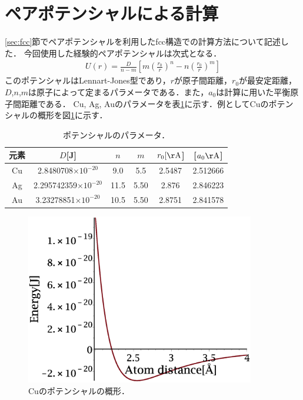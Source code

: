 \section{ペアポテンシャルによる計算}
\ref{sec:fcc}節でペアポテンシャルを利用したfcc構造での計算方法について記述した．
今回使用した経験的ペアポテンシャルは次式となる．
\begin{eqnarray}
\label{eq:method1}
U(r)=\frac{D}{n-m}\left[m{\left(\frac{r_0}{r}\right)}^n-n{\left(\frac{r_0}{r}\right)}^m\right]
\end{eqnarray}
このポテンシャルはLennart-Jones型であり，$r$が原子間距離，$r_0$が最安定距離，$D$,$n$,$m$は原子によって定まるパラメータである．また，$a_0$は計算に用いた平衡原子間距離である．
Cu, Ag, Auのパラメータを表\ref{tb:potential}に示す．例としてCuのポテンシャルの概形を図\ref{fig:lj}に示す．
\begin{table}[htbp]
\caption{ポテンシャルのパラメータ．}
  \label{tb:potential}
  \centering
  \begin{tabular}{cccccc}\hline
    元素 & $D$[J] & $n$ & $m$ & $r_0[\mathrm{\AA}$] & [$a_0\mathrm{\AA}$]\\ \hline \hline
    Cu & 2.8480708$\times10^{-20}$ & 9.0 & 5.5 & 2.5487 & 2.512666\\
    Ag & 2.295742359$\times10^{-20}$ & 11.5 & 5.50 & 2.876 & 2.846223\\
    Au & 3.23278851$\times10^{-20}$ & 10.5 & 5.50 & 2.8751 & 2.841578\\ \hline
  \end{tabular}
\end{table}
\begin{figure}[htbp]
 \begin{center}
  \includegraphics[width=100mm]{../image/lj.eps}
 \end{center}
 \caption{Cuのポテンシャルの概形．}
 \label{fig:lj}
\end{figure}
